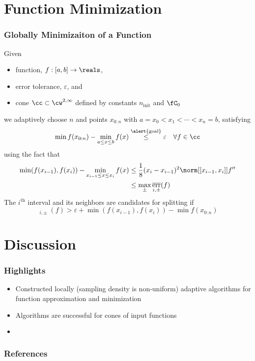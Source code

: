 \documentclass[12pt,compress,xcolor={usenames,dvipsnames}]{beamer} %
\DeclareMathOperator{\init}{init}
\DeclareMathOperator{\oerr}{\overline{err}}
\begin{document}
\section{Function Minimization}
\begin{frame}
	\frametitle{Globally Minimizaiton of a Function}
		\vspace{-4ex}
		
		Given 
		
		\vspace{-3ex}
		\begin{itemize}
			\item \alert{function}, $f:[a,b] \to \reals$, 
			\item \alert{error tolerance}, $\varepsilon$, and 
			\item \alert{cone} $\cc \subset \cw^{2,\infty}$ defined by constants $n_{\init}$ and $\fC_0$
		\end{itemize}
		\vspace{-3ex}
		we \alert{adaptively} choose $n$ and points $x_{0:n}$ with $a = x_0 <x_1 < \cdots < x_n = b$, satisfying
		\begin{equation*}
		\min f(x_{0:n}) - \min_{a \le x \le b} f(x)  \overset{\text{\alert{goal}}}{\le} \varepsilon \quad \forall f \in \cc 
		\end{equation*}
	using the fact that
	\begin{align*}
	\min(f(x_{i-1}), f(x_i)) - \min_{x_{i-1} \le x \le x_i} f(x) & \le \frac{1}{8}(x_{i}-x_{i-1})^2\norm[{[x_{i-1},x_i]}]{f''} \\
	& \le \max_{\pm} \oerr_{i,\pm}(f)
	\end{align*}
	The $i^{\text{th}}$ interval and its neighbors are candidates for splitting if 
	\[
	\oerr_{i,\pm}(f) > \varepsilon + \min(f(x_{i-1}), f(x_i)) - \min f(x_{0:n})
	\]
		
\end{frame}

\section{Discussion}
\begin{frame}
	\frametitle{Highlights }
\begin{itemize}
	\item Constructed \alert{locally} (sampling density is non-uniform) adaptive algorithms for function approximation and minimization
	
	\item Algorithms are successful for \alert{cones} of input functions
	
	\item 
	
	\end{itemize}
	
\end{frame}

\begin{frame}[allowframebreaks]\frametitle{References}
	
\end{frame}
\end{document}
